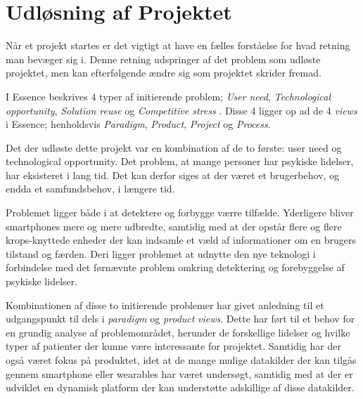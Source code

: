 \section{Udløsning af Projektet}
Når et projekt startes er det vigtigt at have en fælles forståelse for hvad retning man bevæger sig i.
Denne retning udspringer af det problem som udløste projektet, men kan efterfølgende ændre sig som projektet skrider fremad.

I Essence beskrives 4 typer af initierende problem; \textit{User need}, \textit{Technological opportunity}, \textit{Solution reuse} og \textit{Competitive stress} \citet[Kapitel 4 - Orientation]{art:essence}.
Disse 4 ligger op ad de 4 \textit{views} i Essence; henholdsvis \textit{Paradigm}, \textit{Product}, \textit{Project} og \textit{Process}.

Det der udløste dette projekt var en kombination af de to første: user need og technological opportunity.
Det problem, at mange personer har psykiske lidelser, har eksisteret i lang tid.
Det kan derfor siges at der været et brugerbehov, og endda et samfundsbehov, i længere tid.

Problemet ligger både i at detektere og forbygge værre tilfælde.
Yderligere bliver smartphones mere og mere udbredte, samtidig med at der opstår flere og flere krops-knyttede enheder der kan indsamle et væld af informationer om en brugers tilstand og færden.
Deri ligger problemet at udnytte den nye teknologi i forbindelse med det førnævnte problem omkring detektering og forebyggelse af psykiske lidelser.

Kombinationen af disse to initierende problemer har givet anledning til et udgangspunkt til dels i \textit{paradigm} og \textit{product} \textit{views}.
Dette har ført til et behov for en grundig analyse af problemområdet, herunder de forskellige lidelser og hvilke typer af patienter der kunne være interessante for projektet.
Samtidig har der også været fokus på produktet, idet at de mange mulige datakilder der kan tilgås gennem smartphone eller wearables har været undersøgt, samtidig med at der er udviklet en dynamisk platform der kan understøtte adskillige af disse datakilder.

